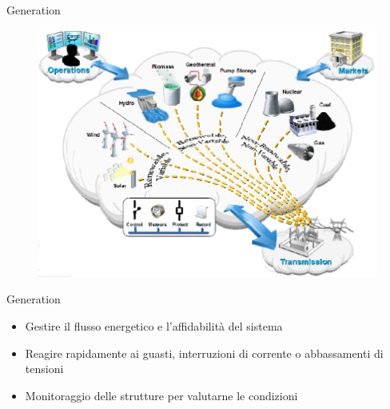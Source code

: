 





\begin{frame}[fragile]{Generation}
	\begin{figure}[h] 
		\includegraphics[scale=0.45]{imgs/gen.png}
	\end{figure}
\end{frame}

\begin{frame}[fragile]{Generation}
	\begin{itemize}[<+- | alert@+>]
		\item Gestire il flusso energetico e l'affidabilità del sistema %
		\item Reagire rapidamente ai guasti, interruzioni di corrente o abbassamenti di tensioni %
		\item Monitoraggio delle strutture per valutarne le condizioni
	\end{itemize}
\end{frame}


